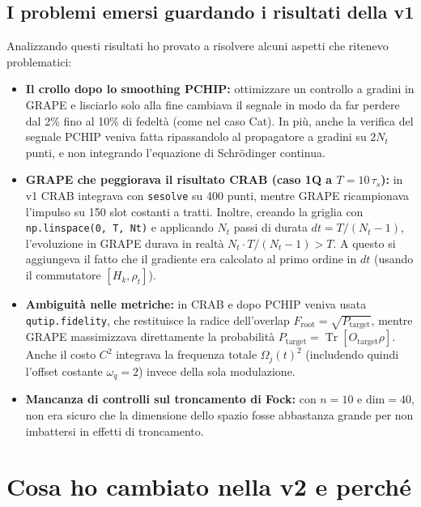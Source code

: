 \documentclass[11pt,a4paper]{article}
\begin{document}
\subsection{I problemi emersi guardando i risultati della v1}
Analizzando questi risultati ho provato a risolvere alcuni aspetti che ritenevo problematici:
\begin{itemize}
    \item \textbf{Il crollo dopo lo smoothing PCHIP:} ottimizzare un controllo a gradini in GRAPE e lisciarlo solo alla fine cambiava il segnale in modo da far perdere dal 2\% fino al 10\% di fedeltà (come nel caso Cat). In più, anche la verifica del segnale PCHIP veniva fatta ripassandolo al propagatore a gradini su $2 N_t$ punti, e non integrando l'equazione di Schrödinger continua.
    \item \textbf{GRAPE che peggiorava il risultato CRAB (caso 1Q a $T=10\,\tau_s$):} in v1 CRAB integrava con \texttt{sesolve} su 400 punti, mentre GRAPE ricampionava l'impulso su 150 slot costanti a tratti. Inoltre, creando la griglia con \texttt{np.linspace(0, T, Nt)} e applicando $N_t$ passi di durata $dt = T/(N_t - 1)$, l'evoluzione in GRAPE durava in realtà $N_t \cdot T/(N_t-1) > T$. A questo si aggiungeva il fatto che il gradiente era calcolato al primo ordine in $dt$ (usando il commutatore $[H_k, \rho_t]$).
    \item \textbf{Ambiguità nelle metriche:} in CRAB e dopo PCHIP veniva usata \texttt{qutip.fidelity}, che restituisce la radice dell'overlap $F_{\text{root}} = \sqrt{P_{\text{target}}}$, mentre GRAPE massimizzava direttamente la probabilità $P_{\text{target}} = \operatorname{Tr}[O_{\text{target}}\rho]$. Anche il costo $C^2$ integrava la frequenza totale $\Omega_j(t)^2$ (includendo quindi l'offset costante $\omega_q = 2$) invece della sola modulazione.
    \item \textbf{Mancanza di controlli sul troncamento di Fock:} con $n=10$ e $\text{dim}=40$, non era sicuro che la dimensione dello spazio fosse abbastanza grande per non imbattersi in effetti di troncamento.
\end{itemize}

\newpage
\section{Cosa ho cambiato nella v2 e perché}
\end{document}
